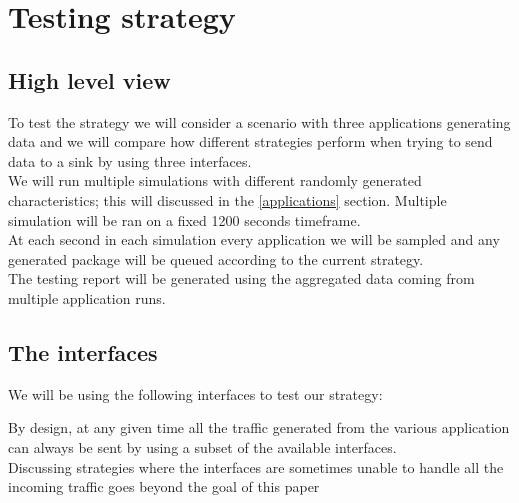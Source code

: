 
\section{Testing strategy}

\subsection{High level view}
To  test the strategy we will consider a scenario with three applications generating data and we will compare how different strategies perform when trying to send data to a sink by using three interfaces. \\
We will run multiple simulations with different randomly generated characteristics; this will discussed in the  \ref{applications} section.
Multiple simulation will be ran on a fixed 1200 seconds timeframe. \\
At each second in each simulation every application we will be sampled and any generated package will be queued according to the current strategy. \\
The testing report will be generated using the aggregated data coming from multiple application runs. 


\subsection{The interfaces}

We will be using the following interfaces to test our strategy:

\begin{table}[h]
	\centering
\end{table}

\begin{mdframed}[hidealllines=true,backgroundcolor=blue!20]
	By design, at any given time all the traffic generated from the various application can always be sent by using a subset of the available interfaces.\\ Discussing strategies where the interfaces are sometimes unable to handle all the incoming traffic goes beyond the goal of this paper
\end{mdframed} 


